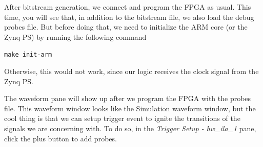\documentclass[11pt]{article}
\begin{document}
\begin{center}
\end{center}

After bitstream generation, we connect and program the FPGA as usual. This time, you will see that, in addition to the bitstream file, we also load the debug probes file. But before doing that, we need to initialize the ARM core (or the Zynq PS) by running the following command

\texttt{make init-arm}

Otherwise, this would not work, since our logic receives the clock signal from the Zynq PS.

\begin{center}
\end{center}

The waveform pane will show up after we program the FPGA with the probes file. This waveform window looks like the Simulation waveform window, but the cool thing is that we can setup trigger event to ignite the transitions of the signals we are concerning with. To do so, in the \emph{Trigger Setup - hw\_ila\_1} pane, click the plus button to add probes.

\begin{center}
\end{center}
\end{document}
